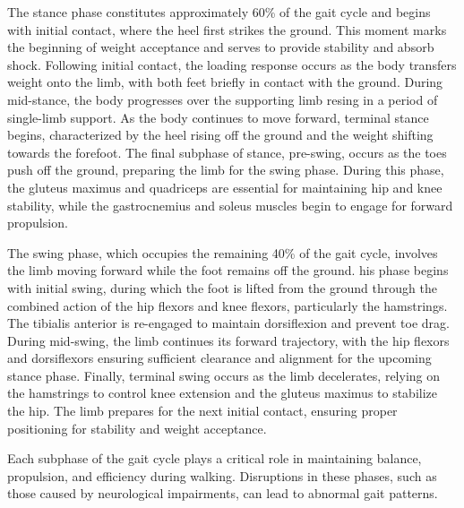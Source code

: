 The stance phase constitutes approximately 60\% of the gait cycle and begins with initial contact, where the heel first strikes the ground. This moment marks the beginning of weight acceptance and serves to provide stability and absorb shock. Following initial contact, the loading response occurs as the body transfers weight onto the limb, with both feet briefly in contact with the ground. During mid-stance, the body progresses over the supporting limb resing in a period of single-limb support. As the body continues to move forward, terminal stance begins, characterized by the heel rising off the ground and the weight shifting towards the forefoot. The final subphase of stance, pre-swing, occurs as the toes push off the ground, preparing the limb for the swing phase. During this phase, the gluteus maximus and quadriceps are essential for maintaining hip and knee stability, while the gastrocnemius and soleus muscles begin to engage for forward propulsion.

The swing phase, which occupies the remaining 40\% of the gait cycle, involves the limb moving forward while the foot remains off the ground. his phase begins with initial swing, during which the foot is lifted from the ground through the combined action of the hip flexors and knee flexors, particularly the hamstrings. The tibialis anterior is re-engaged to maintain dorsiflexion and prevent toe drag. During mid-swing, the limb continues its forward trajectory, with the hip flexors and dorsiflexors ensuring sufficient clearance and alignment for the upcoming stance phase. Finally, terminal swing occurs as the limb decelerates, relying on the hamstrings to control knee extension and the gluteus maximus to stabilize the hip. The limb prepares for the next initial contact, ensuring proper positioning for stability and weight acceptance.

Each subphase of the gait cycle plays a critical role in maintaining balance, propulsion, and efficiency during walking. Disruptions in these phases, such as those caused by neurological impairments, can lead to abnormal gait patterns.






